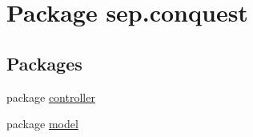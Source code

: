 \hypertarget{namespacesep_1_1conquest}{
\section{Package sep.conquest}
\label{namespacesep_1_1conquest}
}
\subsection*{Packages}
\begin{DoxyCompactItemize}
\item 
package \hyperlink{namespacesep_1_1conquest_1_1controller}{controller}
\item 
package \hyperlink{namespacesep_1_1conquest_1_1model}{model}
\end{DoxyCompactItemize}
